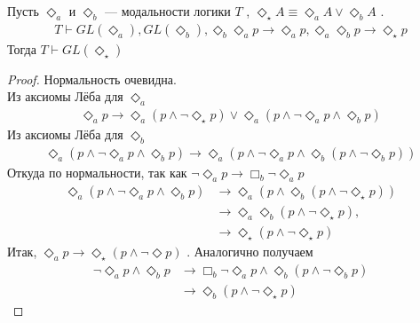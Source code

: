 \documentclass[12pt,a4paper,oneside]{article}
\begin{document}
  \begin{lemma}
    Пусть $\Diamond_a $ и $\Diamond_b $ --- модальности логики $T$ ,
    $\Diamond_\star A \equiv \Diamond_a A \vee  \Diamond_b A$ .
    \begin{align*}
      T \vdash  GL(\Diamond_a ), GL(\Diamond_b ), \Diamond_b \Diamond_a p \rightarrow  \Diamond_a p,
      \Diamond_a \Diamond_b p \rightarrow  \Diamond_\star p
    \end{align*}
    Тогда $T \vdash  GL(\Diamond_\star )$
  \end{lemma}
  \begin{proof}
    Нормальность очевидна. \\ Из аксиомы Лёба для $\Diamond_a $
    \begin{align*}
      \Diamond_a p \rightarrow  \Diamond_a (p \wedge  \neg \Diamond_\star p) \vee  \Diamond_a (p \wedge 
      \neg \Diamond_a p \wedge  \Diamond_b p)
    \end{align*}
    Из аксиомы Лёба для $\Diamond_b $
    \begin{align*}
      \Diamond_a (p \wedge  \neg \Diamond_a p \wedge  \Diamond_b p) \rightarrow  \Diamond_a (p \wedge 
      \neg \Diamond_a p \wedge  \Diamond_b (p \wedge  \neg \Diamond_b p))
    \end{align*}
    Откуда по нормальности, так как
    $\neg \Diamond_a p \rightarrow  \Box_b \neg \Diamond_a p$
    \begin{align*}
      \Diamond_a (p \wedge  \neg \Diamond_a p \wedge  \Diamond_b p) &\rightarrow  \Diamond_a (p \wedge 
      \Diamond_b (p \wedge  \neg \Diamond_\star p))\\
      &\rightarrow  \Diamond_a \Diamond_b (p \wedge  \neg \Diamond_\star p),\\
      &\rightarrow  \Diamond_\star (p \wedge  \neg \Diamond_\star p)
    \end{align*}
    Итак, $\Diamond_a p \rightarrow  \Diamond_\star (p \wedge  \neg \Diamond p)$ .
    Аналогично получаем
    \begin{align*}
      \neg \Diamond_a p \wedge  \Diamond_b p &\rightarrow  \Box_b \neg \Diamond_a p \wedge  \Diamond_b (p
      \wedge  \neg \Diamond_b p)\\
      &\rightarrow  \Diamond_b (p \wedge  \neg \Diamond_\star p)
    \end{align*}
  \end{proof}
  
\end{document}
